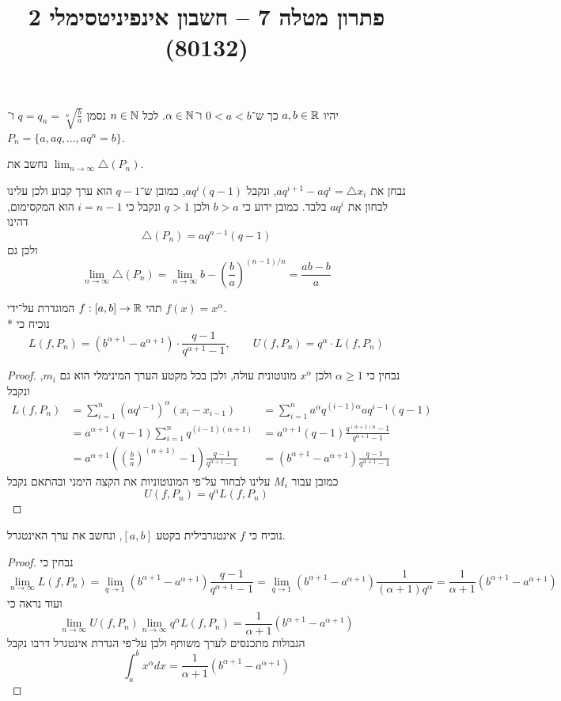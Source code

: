 
\usepackage{tikz}
\DeclareMathOperator\arcsinh{arcsinh}
\title{פתרון מטלה 7 – חשבון אינפיניטסימלי 2 (80132)}


\maketitle
\maketitleprint{}

\Question{}
יהיו $a, b \in \mathbb{R}$ כך ש־$0 < a < b$ ו־$\alpha \in \mathbb{N}$. לכל $n \in \mathbb{N}$ נסמן $q = q_n = \sqrt[n]{\frac{b}{a}}$ ו־$P_n = \{a, aq, \dots, aq^n = b\}$.

\Subquestion{}
נחשב את $\lim_{n \to \infty} \triangle(P_n)$.

נבחן את $aq^{i + 1} - aq^i = \triangle x_i$, ונקבל $aq^i (q - 1)$, כמובן ש־$q - 1$ הוא ערך קבוע ולכן עלינו לבחון את $aq^i$ בלבד. כמובן ידוע כי $b > a$ ולכן $q > 1$ ונקבל כי $i = n - 1$ הוא המקסימום, דהינו
\[
	\triangle(P_n) = aq^{n - 1} (q - 1)
\]
ולכן גם
\[
	\lim_{n \to \infty} \triangle(P_n)
	= \lim_{n \to \infty} b - {(\frac{b}{a})}^{(n-1)/n}
	= \frac{ab - b}{a}
\]

\Subquestion{}
תהי $f : [a, b] \to \mathbb{R}$ המוגדרת על־ידי $f(x) = x^\alpha$. \\*
נוכיח כי
\[
	L(f, P_n) = (b^{\alpha + 1} - a^{\alpha + 1}) \cdot \frac{q - 1}{q^{\alpha + 1} - 1},
	\qquad
	U(f, P_n) = q^\alpha \cdot L(f, P_n)
\]
\begin{proof}
	נבחין כי $\alpha \ge 1$ ולכן $x^\alpha$ מונוטונית עולה, ולכן בכל מקטע הערך המינימלי הוא גם $m_i$, ונקבל
	\begin{align*}
		L(f, P_n)
		& = \sum_{i = 1}^{n} {(a q^{i - 1})}^\alpha (x_i - x_{i - 1})
		& = \sum_{i = 1}^{n} a^{\alpha} q^{(i - 1) \alpha}aq^{i - 1}(q - 1) \\
		& = a^{\alpha + 1} (q - 1) \sum_{i = 1}^{n} q^{(i - 1)(\alpha + 1)}
		& = a^{\alpha + 1} (q - 1) \frac{q^{(\alpha + 1) n} - 1}{q^{\alpha + 1} - 1} \\
		& = a^{\alpha + 1} ({(\frac{b}{a})}^{(\alpha + 1)} - 1) \frac{q - 1}{q^{\alpha + 1} - 1}
		& = (b^{\alpha + 1} - a^{\alpha + 1}) \frac{q - 1}{q^{\alpha + 1} - 1}
	\end{align*}
	כמובן עבור $M_i$ עלינו לבחור על־פי המונוטוניות את הקצה הימני ובהתאם נקבל
	\[
		U(f, P_n) = q^\alpha L(f, P_n)
	\]
\end{proof}

\Subquestion{}
נוכיח כי $f$ אינטגרבילית בקטע $[a, b]$, ונחשב את ערך האינטגרל.
\begin{proof}
	נבחין כי
	\[
		\lim_{n \to \infty} L(f, P_n)
		= \lim_{q \to 1} (b^{\alpha + 1} - a^{\alpha + 1}) \frac{q - 1}{q^{\alpha + 1} - 1}
		= \lim_{q \to 1} (b^{\alpha + 1} - a^{\alpha + 1}) \frac{1}{(\alpha + 1) q^{\alpha}}
		= \frac{1}{\alpha + 1} (b^{\alpha + 1} - a^{\alpha + 1})
	\]
	ועוד נראה כי
	\[
		\lim_{n \to \infty} U(f, P_n)
		\lim_{n \to \infty} q^\alpha L(f, P_n)
		= \frac{1}{\alpha + 1} (b^{\alpha + 1} - a^{\alpha + 1})
	\]
	הגבולות מתכנסים לערך משותף ולכן על־פי הגדרת אינטגרל דרבו נקבל
	\[
		\int_{a}^{b} x^\alpha dx
		= \frac{1}{\alpha + 1} (b^{\alpha + 1} - a^{\alpha + 1})
	\]
\end{proof}

